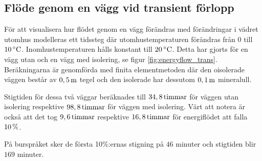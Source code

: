 \subsection{Flöde genom en vägg vid transient förlopp}


För att visualisera hur flödet genom en vägg förändras med
förändringar i vädret utomhus modelleras ett tidssteg där utomhustemperaturen förändras från 0 till $\unit[10]{^\circ C}$. Inomhustemperaturen hålls konstant till $\unit[20]{^\circ C}$. Detta har gjorts för en vägg utan och en vägg med isolering, se figur \ref{fig:energyflow_trans}. Beräkningarna är genomförda med finita elementmetoden där den oisolerade väggen består av $\unit[0,5]{m}$ tegel och den isolerade har dessutom $\unit[0,1]{m}$ mineralull.

Stigtiden för dessa två väggar beräknades till $\unit[34,8]{timmar}$ för väggen utan isolering respektive $\unit[98,8]{timmar}$ för väggen med isolering. 
Värt att notera är också att det tog $\unit[9,6]{timmar}$ respektive $\unit[16,8]{timmar}$ för energiflödet att falla $\unit[10]{\%}$. 

På burspråket sker de första 10\%:ernas stigning på $46$ minuter och stigtiden blir $169$ minuter.

